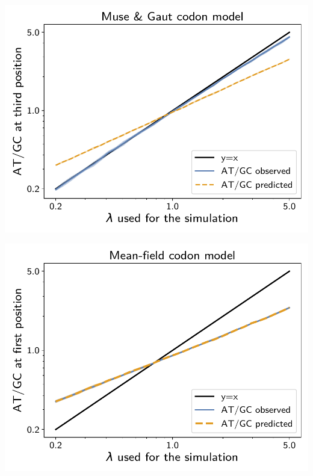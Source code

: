 \documentclass{article}
\begin{document}
\begin{center}
\begin{minipage}{0.325\linewidth}
    \end{minipage}
    \hfill
    \begin{minipage}{0.325\linewidth}
        \includegraphics[width=\linewidth, page=1]{inference_simulations/obs_atgc_3_MG.pdf}
    \end{minipage}
    \hfill
    \begin{minipage}{0.325\linewidth}
        \includegraphics[width=\linewidth, page=1]{inference_simulations/obs_atgc_1_MF.pdf}
    \end{minipage}

\end{center}
\end{document}
